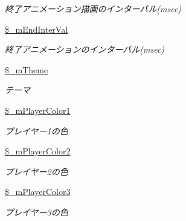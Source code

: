 \begin{DoxyCompactItemize}
\begin{DoxyCompactList}\small\item\em 終了アニメーション描画のインターバル(msec) \end{DoxyCompactList}\item 
\mbox{\label{class_reversi_setting_a9a7c91b280df7302a2545e8249f7a98b}} 
\hyperlink{class_reversi_setting_a9a7c91b280df7302a2545e8249f7a98b}{\$\+\_\+m\+End\+Inter\+Val}
\begin{DoxyCompactList}\small\item\em 終了アニメーションのインターバル(msec) \end{DoxyCompactList}\item 
\mbox{\label{class_reversi_setting_a473e416a1757c023d7bd59a5ea12b12a}} 
\hyperlink{class_reversi_setting_a473e416a1757c023d7bd59a5ea12b12a}{\$\+\_\+m\+Theme}
\begin{DoxyCompactList}\small\item\em テーマ \end{DoxyCompactList}\item 
\mbox{\label{class_reversi_setting_a8e0bf25cff29a3743b30c7a6d17a4855}} 
\hyperlink{class_reversi_setting_a8e0bf25cff29a3743b30c7a6d17a4855}{\$\+\_\+m\+Player\+Color1}
\begin{DoxyCompactList}\small\item\em プレイヤー1の色 \end{DoxyCompactList}\item 
\mbox{\label{class_reversi_setting_a15cb29ead1e4f1bb90eb82819317ea87}} 
\hyperlink{class_reversi_setting_a15cb29ead1e4f1bb90eb82819317ea87}{\$\+\_\+m\+Player\+Color2}
\begin{DoxyCompactList}\small\item\em プレイヤー2の色 \end{DoxyCompactList}\item 
\mbox{\label{class_reversi_setting_a74987c27d9581122dd369991256d44ed}} 
\hyperlink{class_reversi_setting_a74987c27d9581122dd369991256d44ed}{\$\+\_\+m\+Player\+Color3}
\begin{DoxyCompactList}\small\item\em プレイヤー3の色 \end{DoxyCompactList}\item 

\end{DoxyCompactItemize}
